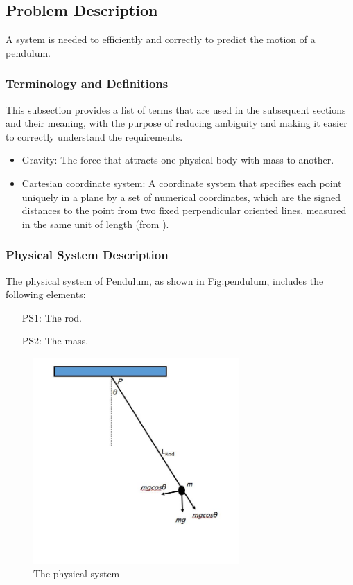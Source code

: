 \documentclass[12pt]{article}
\begin{document}
\subsection{Problem Description}
\label{Sec:ProbDesc}
A system is needed to efficiently and correctly to predict the motion of a pendulum.

\subsubsection{Terminology and Definitions}
\label{Sec:TermDefs}
This subsection provides a list of terms that are used in the subsequent sections and their meaning, with the purpose of reducing ambiguity and making it easier to correctly understand the requirements.

\begin{itemize}
\item{Gravity: The force that attracts one physical body with mass to another.}
\item{Cartesian coordinate system: A coordinate system that specifies each point uniquely in a plane by a set of numerical coordinates, which are the signed distances to the point from two fixed perpendicular oriented lines, measured in the same unit of length (from \cite{cartesianWiki}).}
\end{itemize}
\subsubsection{Physical System Description}
\label{Sec:PhysSyst}
The physical system of Pendulum, as shown in \hyperref[Figure:pendulum]{Fig:pendulum}, includes the following elements:

\begin{itemize}
\item[PS1:]{The rod.}
\item[PS2:]{The mass.}
\end{itemize}
\begin{figure}
\begin{center}
\includegraphics[width=0.7\textwidth]{../../../datafiles/DblPendulum/pendulum.jpg}
\caption{The physical system}
\label{Figure:pendulum}
\end{center}
\end{figure}
\end{document}
